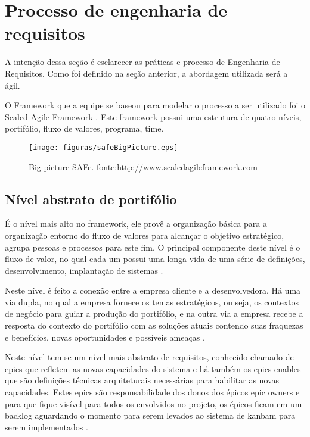 \section{Processo de engenharia de requisitos}

A intenção dessa seção é esclarecer as práticas e processo de Engenharia de Requisitos. Como foi definido na seção anterior, a abordagem utilizada será a ágil.

O Framework que a equipe se baseou para modelar o processo a ser utilizado foi o Scaled Agile Framework \cite{safe}. Este framework possui uma estrutura de quatro níveis, portifólio, fluxo de valores, programa, time.

\begin{figure}[H]
    \centering
    \label{safeBigPicture}
    \texttt{[image: figuras/safeBigPicture.eps]}
    \caption{Big picture SAFe. fonte:\url{http://www.scaledagileframework.com}}
\end{figure}

\subsection{Nível abstrato de portifólio}

É o nível mais alto no framework, ele provê a organização básica para a organização entorno do fluxo de valores para alcançar o objetivo estratégico, agrupa pessoas e processos para este fim. O principal componente deste nível é o fluxo de valor, no qual cada um possui uma longa vida de uma série de definições, desenvolvimento, implantação de sistemas \cite{safe}.

Neste nível é feito a conexão entre a empresa cliente e a desenvolvedora. Há uma via dupla, no qual a empresa fornece os temas estratégicos, ou seja, os contextos de negócio para guiar a produção do portifólio, e na outra via a empresa recebe a resposta do contexto do portifólio com as soluções atuais contendo suas fraquezas e benefícios, novas oportunidades e possíveis ameaças \cite{safe}.

Neste nível tem-se um nível mais abstrato de requisitos, conhecido chamado de epics que refletem as novas capacidades do sistema e há também os epics enables que são definições técnicas arquiteturais necessárias para habilitar as novas capacidades. Estes epics são responsabilidade dos donos dos épicos epic owners e para que fique visível para todos os envolvidos no projeto, os épicos ficam em um backlog aguardando o momento para serem levados ao sistema de kanbam para serem implementados \cite{safe}.

